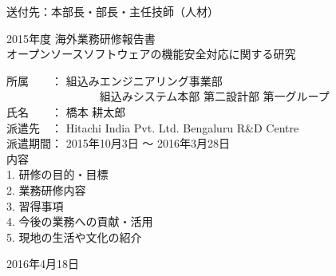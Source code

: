 \begin{titlepage}
\begin{flushleft}
{\large 送付先：本部長・部長・主任技師（人材）}
\end{flushleft}
\begin{center}
\vspace*{150truept}
{\Huge 2015年度 海外業務研修報告書}\\
\vspace{20truept}
{\Large オープンソースソフトウェアの機能安全対応に関する研究}\\
\vspace{50truept}
\begin{flushleft}
\hspace*{40truept} {\Large 所属　　： 組込みエンジニアリング事業部\\
　　　　　　　　 組込みシステム本部 第二設計部 第一グループ}\\
\vspace{15truept}
\hspace*{40truept} {\Large 氏名　　： 橋本 耕太郎}\\
\vspace{15truept}
\hspace*{40truept} {\Large 派遣先　： Hitachi India Pvt. Ltd. Bengaluru R\&D Centre}\\
\vspace{15truept}
\hspace*{40truept} {\Large 派遣期間： 2015年10月3日 〜 2016年3月28日}\\
\vspace{80truept}
\hspace*{150truept} {\Large 内容}\\
\vspace{10truept}
\hspace*{150truept} {\large 1. 研修の目的・目標}\\
\hspace*{150truept} {\large 2. 業務研修内容}\\
\hspace*{150truept} {\large 3. 習得事項}\\
\hspace*{150truept} {\large 4. 今後の業務への貢献・活用}\\
\hspace*{150truept} {\large 5. 現地の生活や文化の紹介}\\
\end{flushleft}
\vspace{40truept}
{\large 2016年4月18日}
\end{center}
\end{titlepage}
